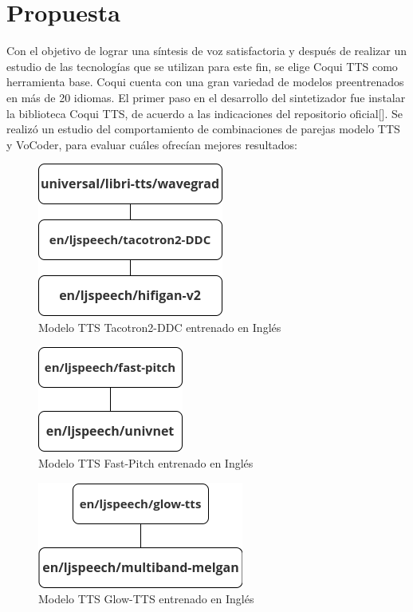 \chapter{Propuesta}\label{chapter:proposal}

Con el objetivo de lograr una síntesis de voz satisfactoria y después de realizar un estudio de las tecnologías que se utilizan para este fin, se elige Coqui TTS como herramienta base. Coqui cuenta con una gran variedad de modelos preentrenados en más de 20 idiomas.  
El primer paso en el desarrollo del sintetizador fue instalar la biblioteca Coqui TTS, de acuerdo a las indicaciones del repositorio oficial[\cite{coqui-doc}]. Se realizó un estudio del comportamiento de combinaciones de parejas modelo TTS y VoCoder, para evaluar cuáles ofrecían mejores resultados:



\begin{figure}[H]
	\centering
	\includegraphics[width=0.3\linewidth]{Graphics/en_ljspeech}
	\caption{Modelo TTS Tacotron2-DDC entrenado en Inglés}
	\label{enljspeech}
\end{figure}

\begin{figure}[H]
	\centering
	\includegraphics[width=0.3\linewidth]{Graphics/fastpitch}
	\caption{Modelo TTS Fast-Pitch entrenado en Inglés}
	\label{fastpitch}
\end{figure}
\begin{figure}[H]
	\centering
	\includegraphics[width=0.4\linewidth]{Graphics/glow_tts}
	\caption{Modelo TTS Glow-TTS entrenado en Inglés}
	\label{glowtts}
\end{figure}

